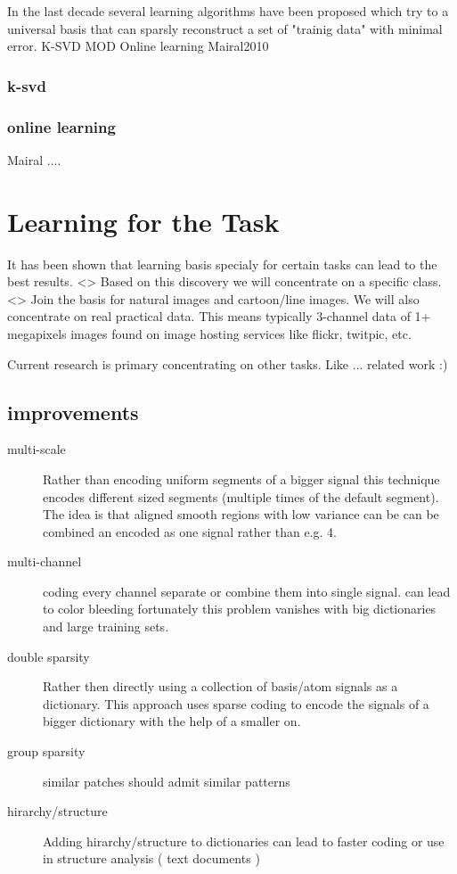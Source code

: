 In the last decade several learning algorithms have been proposed which try to a universal basis that 
can sparsly reconstruct a set of "trainig data" with minimal error. 
K-SVD
MOD
Online learning
Mairal2010

\subsubsection{k-svd}
\subsubsection{online learning}
Mairal .... \cite{Mairal2010}

\section{Learning for the Task}
It has been shown that learning basis specialy for certain tasks can lead to the best results\cite{}.  <>
Based on this discovery we will concentrate on a specific class. <> Join the basis for natural images and cartoon/line images.
We will also concentrate on real practical data. This means typically 3-channel data of 1+ megapixels images found on image hosting services like flickr, twitpic, etc.

Current research is primary concentrating on other tasks. 
Like ... related work :)

\subsection{improvements}

\begin{description}
\item[multi-scale]
Rather than encoding uniform segments of a bigger signal this technique encodes different sized 
segments (multiple times of the default segment). The idea is that aligned smooth regions with low variance can be 
can be combined an encoded as one signal rather than e.g. 4. \cite{saprio}

\item[multi-channel]
coding every channel separate or combine them
into single signal. can lead to color bleeding \cite{mairal08sparse}
fortunately this problem vanishes with big dictionaries and large training sets. \cite{mairal08sparse}

\item[double sparsity]
Rather then directly using a collection of basis/atom signals as a dictionary. This approach uses sparse coding
to encode the signals of a bigger dictionary with the help of a smaller on. \cite{double sparsity}

\item[group sparsity]
similar patches should admit similar patterns
\cite{double sparsity}

\item[hirarchy/structure]
Adding hirarchy/structure to dictionaries can lead to faster coding or use in structure analysis ( text documents )
\cite{Jenatton2010}

\end{description}




